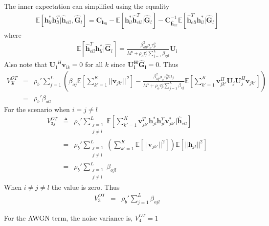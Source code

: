 \documentclass[10pt, a4paper, twoside,fleqn]{article}
\begin{document}
The inner expectation can simplified using the equality \cite{bib:rmtBook}
\begin{eqnarray}
	\mathbb{E}[\pmb{h}_{ll}^*\pmb{h}^T_{ll}|\pmb{\hat h}_{ell}, \pmb{\hat G}_{l}] = \pmb{C}_{\pmb{h}_{ll}}-\mathbb{E}[\pmb{h}_{ll}^* \pmb{\hat h}^T_{ell}| \pmb{\hat G}_{l}] - \pmb{C}_{\pmb{\hat h}_{ell}}^{-1}\mathbb{E}[\pmb{\hat h}_{ell}^T \pmb{h}_{ll}^*| \pmb{\hat G}_{l}]
\end{eqnarray}
where
\begin{eqnarray}
	\mathbb{E}[\pmb{\hat h}_{ell}^T \pmb{h}_{ll}^*| \pmb{\hat G}_{l}] = \frac{\beta_{oll}^{2}\rho_o\tau_p^o}{M'+\rho_o\tau_p^o\sum\limits_{j=1}^{L}\beta_{ojl}}\pmb{U}_l
\end{eqnarray}
Also note that $\pmb{U_l}^H\pmb{v}_{lk}=0$ for all $k$ since $\pmb{U_l^H}\pmb{\hat G_l}=0$. Thus
\begin{eqnarray}\label{eqn:otv3}
	V_{3l}^{OT} &=& \rho_b' \sum_{j=1}^{L} \left( \beta_{oj} \mathbb{E}\left[\sum_{k'=1}^{K}||\pmb{v}_{jk'}||^2\right]
					- \frac{\beta_{oj}^{2}\rho_o\tau_p^o\pmb{U}_j}{M'+\rho_o\tau_p^o\sum\limits_{j=1}^{L}\beta_{oj}} \mathbb{E}\left[\sum_{k'=1}^{K} \pmb{v}_{jk'}^H \pmb{U}_j \pmb{U}_j^H \pmb{v}_{jk'}\right]\right) \nonumber \\
        &=& \rho_b'\beta_{oll}
\end{eqnarray}
For the scenario when $i=j\neq l$
\begin{eqnarray}\label{eqn:v3jot}
V_{3j}^{OT} &\triangleq& \rho_b' \sum_{\substack{j=1 \\ j\neq l}}^{L} \mathbb{E}\left[\sum_{k'=1}^{K} \pmb{v}_{jk'}^T \pmb{h}_{jl}^*  \pmb{h}_{jl}^T \pmb{v}_{jk'}^*| \pmb{\hat h}_{ell} \right] \nonumber \\
           &=&  \rho_b' \sum_{\substack{j=1 \\ j\neq l}}^{L}\left(\sum_{k'=1}^{K} \mathbb{E}\left[||\pmb{v}_{jk'}||^2\right]\right)\mathbb{E}\left[ ||\pmb{h}_{jl}||^2\right] \nonumber \\
           &=&\rho_b' \sum_{\substack{j=1 \\ j\neq l}}^{L}\beta_{ojl}
\end{eqnarray}
When $i\neq j\neq l$ the value is zero. Thus
\begin{eqnarray}
V_3^{OT} &=&\rho_b' \sum_{j=1}^{L}\beta_{ojl}
\end{eqnarray}

For the AWGN term, the noise variance is, $V_4^{OT} = 1$
\end{document}
